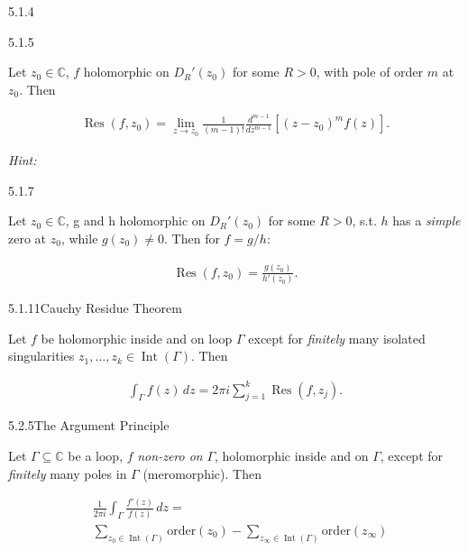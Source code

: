 \documentclass[10pt,landscape]{article}
\DeclareMathOperator{\Int}{Int}
\DeclareMathOperator{\Res}{Res}
\newcommand{\Hint}{\textit{Hint: }}
\begin{document}
\begin{multicols}{3}
\begin{lemma}{5.1.4}{}
\end{lemma}

\begin{lemma}{5.1.5}{}

    Let $z_0 \in \mathbb{C}$, $f$ holomorphic on $D_R'(z_0)$ for some $R > 0$, with pole of order $m$ at $z_0$. Then

        \begin{align*}
            \Res\!{(f,z_0)} = \lim_{z \to z_0} \textstyle \frac{1}{(m-1)!} \frac{d^{m-1}}{dz^{m-1}} [(z - z_0)^m f(z)].
        \end{align*}

    \Hint

\end{lemma}

\begin{lemma}{5.1.7}{}

    Let $z_0 \in \mathbb{C}$, g and h holomorphic on $D_R'(z_0)$ for some $R > 0$, s.t. $h$ has a \emph{simple} zero at $z_0$, while $g(z_0) \neq 0$. Then for $f = g/h$:

        \begin{align*}
            \Res\!{(f,z_0)} = \frac{g(z_0)}{h'(z_0)}.
        \end{align*}

\end{lemma}

\begin{theorem}{5.1.11}{Cauchy Residue Theorem}

    Let $f$ be holomorphic inside and on loop $\Gamma$ except for \emph{finitely} many isolated singularities $z_1,\hdots,z_k \in \Int\!{(\Gamma)}$. Then

        \begin{align*}
            \int_{\Gamma} f(z) \,dz = 2 \pi i \sum_{j=1}^k \Res\!{(f,z_j)}.
        \end{align*}

\end{theorem}

\begin{theorem}{5.2.5}{The Argument Principle}

    Let $\Gamma \subseteq \mathbb{C}$ be a loop, $f$ \emph{non-zero on} $\Gamma$, holomorphic inside and on $\Gamma$, except for \emph{finitely} many poles in $\Gamma$ (meromorphic). Then

        \begin{align*}
            &\frac{1}{2\pi i} \int_{\Gamma} \frac{f'(z)}{f(z)} \,dz = \\
            &\sum_{z_0 \in \Int\!{(\Gamma)}} \mathrm{order}(z_0) - \sum_{z_{\infty} \in \Int\!{(\Gamma)}} \mathrm{order}(z_{\infty})
        \end{align*}


\end{theorem}
\end{multicols}
\end{document}
